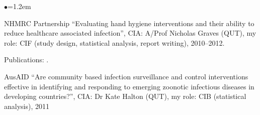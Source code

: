 \documentclass[a4paper,11pt]{article}
\renewcommand{\labelitemi}{$\bullet$}
\begin{document}
\begin{raggedright}
\begin{list}{\labelitemi}{\leftmargin=1.2em}





\item NHMRC Partnership ``Evaluating hand hygiene interventions and their ability to reduce healthcare associated infection'', CIA: A/Prof Nicholas Graves (QUT), my role: CIF (study design, statistical analysis, report writing), 2010--2012.

    Publications: .

\item AusAID ``Are community based infection surveillance and control interventions effective in identifying and responding to emerging zoonotic infectious diseases in developing countries?'', CIA: Dr Kate Halton (QUT), my role: CIB (statistical analysis), 2011


\end{list}
\end{raggedright}
\end{document}
